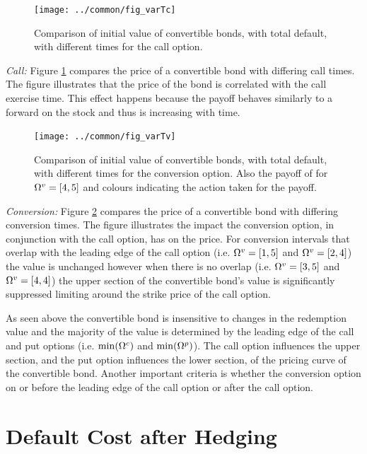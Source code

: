 \documentclass[a4paper,11pt,oneside]{report}
\theoremstyle{plain}
\theoremstyle{definition}
\begin{document}
\begin{figure}[htb!]
 \centering
 \texttt{[image: ../common/fig\_varTc]}
 \caption[Varying Call Time]{Comparison of initial value of convertible bonds, with total default, with different times for the call option.}
 \label{fig:varTc}
\end{figure}

\emph{Call:} Figure \ref{fig:varTc} compares the price of a convertible bond with differing call times.  The figure illustrates that the price of the bond is correlated with the call exercise time.  This effect happens because the payoff behaves similarly to a forward on the stock and thus is increasing with time.

\begin{figure}[htb!]
 \centering
 \texttt{[image: ../common/fig\_varTv]}
 \caption[Varying Call Time]{Comparison of initial value of convertible bonds, with total default, with different times for the conversion option.  Also the payoff of for $\Omega^{v} = [4, 5]$ and colours indicating the action taken for the payoff.}
 \label{fig:varTv}
\end{figure}

\emph{Conversion:} Figure \ref{fig:varTv} compares the price of a convertible bond with differing conversion times.  The figure illustrates the impact the conversion option, in conjunction with the call option, has on the price.  For conversion intervals that overlap with the leading edge of the call option (i.e. $\Omega^{v} = [1, 5]$ and $\Omega^{v} = [2, 4]$) the value is unchanged however when there is no overlap (i.e. $\Omega^{v} = [3, 5]$ and $\Omega^{v} = [4, 4]$) the upper section of the convertible bond's value is significantly suppressed limiting around the strike price of the call option.

As seen above the convertible bond is insensitive to changes in the redemption value and the majority of the value is determined by the leading edge of the call and put options (i.e. $\min(\Omega^{c})$ and $\min(\Omega^{p})$).  The call option influences the upper section, and the put option influences the lower section, of the pricing curve of the convertible bond.  Another important criteria is whether the conversion option on or before the leading edge of the call option or after the call option.


\section{Default Cost after Hedging}
\end{document}
